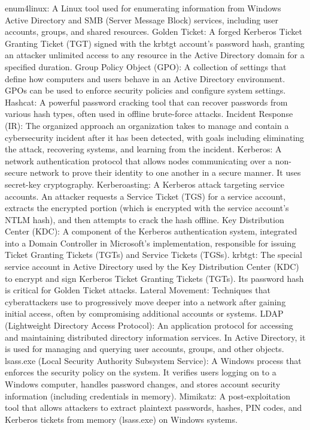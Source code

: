enum4linux: A Linux tool used for enumerating information from Windows Active Directory and SMB (Server Message Block) services, including user accounts, groups, and shared resources.
Golden Ticket: A forged Kerberos Ticket Granting Ticket (TGT) signed with the krbtgt account's password hash, granting an attacker unlimited access to any resource in the Active Directory domain for a specified duration.
Group Policy Object (GPO): A collection of settings that define how computers and users behave in an Active Directory environment. GPOs can be used to enforce security policies and configure system settings.
Hashcat: A powerful password cracking tool that can recover passwords from various hash types, often used in offline brute-force attacks.
Incident Response (IR): The organized approach an organization takes to manage and contain a cybersecurity incident after it has been detected, with goals including eliminating the attack, recovering systems, and learning from the incident.
Kerberos: A network authentication protocol that allows nodes communicating over a non-secure network to prove their identity to one another in a secure manner. It uses secret-key cryptography.
Kerberoasting: A Kerberos attack targeting service accounts. An attacker requests a Service Ticket (TGS) for a service account, extracts the encrypted portion (which is encrypted with the service account's NTLM hash), and then attempts to crack the hash offline.
Key Distribution Center (KDC): A component of the Kerberos authentication system, integrated into a Domain Controller in Microsoft's implementation, responsible for issuing Ticket Granting Tickets (TGTs) and Service Tickets (TGSs).
krbtgt: The special service account in Active Directory used by the Key Distribution Center (KDC) to encrypt and sign Kerberos Ticket Granting Tickets (TGTs). Its password hash is critical for Golden Ticket attacks.
Lateral Movement: Techniques that cyberattackers use to progressively move deeper into a network after gaining initial access, often by compromising additional accounts or systems.
LDAP (Lightweight Directory Access Protocol): An application protocol for accessing and maintaining distributed directory information services. In Active Directory, it is used for managing and querying user accounts, groups, and other objects.
lsass.exe (Local Security Authority Subsystem Service): A Windows process that enforces the security policy on the system. It verifies users logging on to a Windows computer, handles password changes, and stores account security information (including credentials in memory).
Mimikatz: A post-exploitation tool that allows attackers to extract plaintext passwords, hashes, PIN codes, and Kerberos tickets from memory (lsass.exe) on Windows systems.

